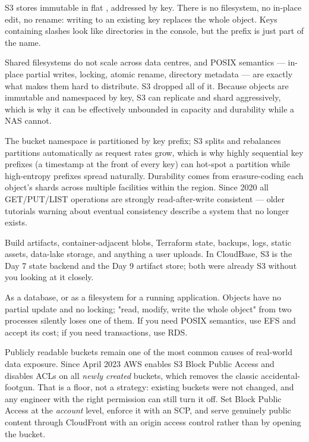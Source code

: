 
 S3 stores immutable  in flat , addressed by key. There is no filesystem, no in-place edit, no rename: writing to an existing key replaces the whole object. Keys containing slashes look like directories in the console, but the prefix is just part of the name.

 Shared filesystems do not scale across data centres, and POSIX semantics --- in-place partial writes, locking, atomic rename, directory metadata --- are exactly what makes them hard to distribute. S3 dropped all of it. Because objects are immutable and namespaced by key, S3 can replicate and shard aggressively, which is why it can be effectively unbounded in capacity and durability while a NAS cannot.

 The bucket namespace is partitioned by key prefix; S3 splits and rebalances partitions automatically as request rates grow, which is why highly sequential key prefixes (a timestamp at the front of every key) can hot-spot a partition while high-entropy prefixes spread naturally. Durability comes from erasure-coding each object's shards across multiple facilities within the region. Since 2020 all GET/PUT/LIST operations are strongly read-after-write consistent --- older tutorials warning about eventual consistency describe a system that no longer exists.

 Build artifacts, container-adjacent blobs, Terraform state, backups, logs, static assets, data-lake storage, and anything a user uploads. In CloudBase, S3 is the Day 7 state backend and the Day 9 artifact store; both were already S3 without you looking at it closely.

 As a database, or as a filesystem for a running application. Objects have no partial update and no locking; "read, modify, write the whole object" from two processes silently loses one of them. If you need POSIX semantics, use EFS and accept its cost; if you need transactions, use RDS.

\begin{secwarn}
Publicly readable buckets remain one of the most common causes of real-world data exposure. Since April 2023 AWS enables S3 Block Public Access and disables ACLs on all \emph{newly created} buckets, which removes the classic accidental- footgun. That is a floor, not a strategy: existing buckets were not changed, and any engineer with the right permission can still turn it off. Set Block Public Access at the \emph{account} level, enforce it with an SCP, and serve genuinely public content through CloudFront with an origin access control rather than by opening the bucket.
\end{secwarn}

